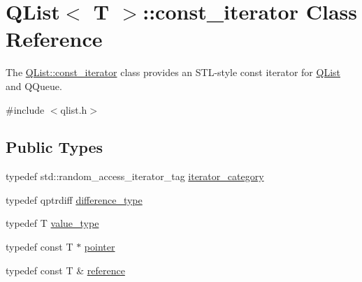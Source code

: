 \hypertarget{class_q_list_1_1const__iterator}{}\section{Q\+List$<$ T $>$\+:\+:const\+\_\+iterator Class Reference}
\label{class_q_list_1_1const__iterator}


The \hyperlink{class_q_list_1_1const__iterator}{Q\+List\+::const\+\_\+iterator} class provides an S\+T\+L-\/style const iterator for \hyperlink{class_q_list}{Q\+List} and Q\+Queue.  




{\ttfamily \#include $<$qlist.\+h$>$}

\subsection*{Public Types}
\begin{DoxyCompactItemize}
\item 
typedef std\+::random\+\_\+access\+\_\+iterator\+\_\+tag \hyperlink{class_q_list_1_1const__iterator_a3f60c0d419aa760c74baf9259c5309a7}{iterator\+\_\+category}
\item 
typedef qptrdiff \hyperlink{class_q_list_1_1const__iterator_a3fd13f34a4cad0b55bff738b349a87c6}{difference\+\_\+type}
\item 
typedef T \hyperlink{class_q_list_1_1const__iterator_a47f4f5c7fa5edd61cf19a5dde299c588}{value\+\_\+type}
\item 
typedef const T $\ast$ \hyperlink{class_q_list_1_1const__iterator_a533c6c850de0bc2484878d5c4bcb0513}{pointer}
\item 
typedef const T \& \hyperlink{class_q_list_1_1const__iterator_a52b9df9ae3c6d68e3b34cc0430e782e6}{reference}
\end{DoxyCompactItemize}
